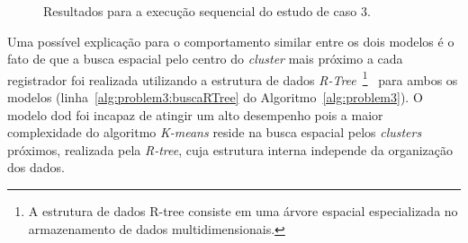 \begin{figure}[hbt]
    \centering
    \caption{Resultados para a execução sequencial do estudo de caso 3.}
    \label{fig:resultsProblem3sequential}
\end{figure}

Uma possível explicação para o comportamento similar entre os dois modelos é o fato de que a busca espacial pelo centro do \textit{cluster} mais próximo a cada registrador foi realizada utilizando a estrutura de dados \textit{R-Tree}~\footnote{A estrutura de dados R-tree consiste em uma árvore espacial especializada no armazenamento de dados multidimensionais.}~\cite{manolopoulos2010r} para ambos os modelos (linha~\ref{alg:problem3:buscaRTree} do Algoritmo~\ref{alg:problem3}). 
O modelo \ac{dod} foi incapaz de atingir um alto desempenho pois a maior complexidade do algoritmo \textit{K-means} reside na busca espacial pelos \textit{clusters} próximos, realizada pela \textit{R-tree}, cuja estrutura interna independe da organização dos dados.

